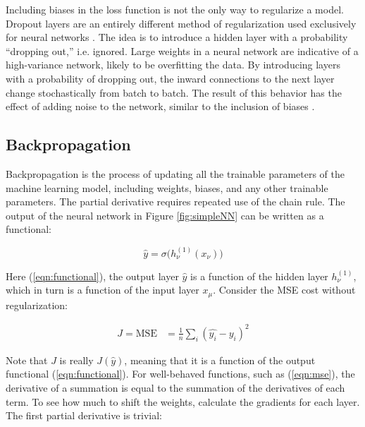 Including biases in the loss function is not the only way to regularize a model. Dropout layers are an entirely different method of regularization used exclusively for neural networks \cite{dropout-srivastava2014}. The idea is to introduce a hidden layer with a probability ``dropping out,'' i.e. ignored. Large weights in a neural network are indicative of a high-variance network, likely to be overfitting the data. By introducing layers with a probability of dropping out, the inward connections to the next layer change stochastically from batch to batch. The result of this behavior has the effect of adding noise to the network, similar to the inclusion of biases \cite{conv-dropout-layers} \cite{conv-dropout-layers2}.

\subsection{Backpropagation} \label{sec:backprop}
Backpropagation is the process of updating all the trainable parameters of the machine learning model, including weights, biases, and any other trainable parameters. The partial derivative requires repeated use of the chain rule. The output of the neural network in Figure \ref{fig:simpleNN} can be written as a functional:


\begin{equation}
    \label{eqn:functional}
    \hat{y} = \sigma \bigl( h_\nu ^{(1)} \left( x_\nu \right) \bigr)
\end{equation}

\noindent Here (\ref{eqn:functional}), the output layer $ \hat{y} $ is a function of the hidden layer $ h_\nu ^{(1)} $, which in turn is a function of the input layer $ x_\mu $. Consider the MSE cost without regularization: 


\begin{align}
    \label{eqn:mse}
    J = \text{MSE} &= \frac{1}{n} \sum_i \left( \hat{y_i} - y_i \right)^2
\end{align}

\noindent Note that $ J $ is really $ J(\hat{y}) $, meaning that it is a function of the output functional (\ref{eqn:functional}). For well-behaved functions, such as (\ref{eqn:mse}), the derivative of a summation is equal to the summation of the derivatives of each term. To see how much to shift the weights, calculate the gradients for each layer. The first partial derivative is trivial:


